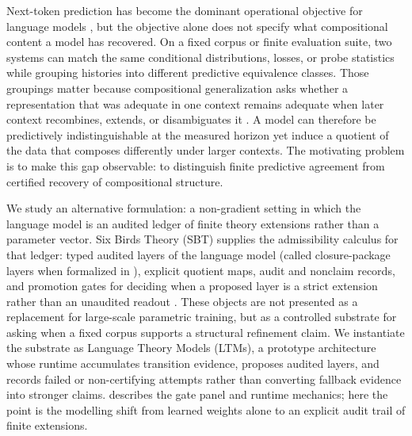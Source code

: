\documentclass{article}
\theoremstyle{definition}
\begin{document}
Next-token prediction has become the dominant operational objective for language models \cite{Vaswani2017Attention,Radford2019GPT2,Kaplan2020Scaling}, but the objective alone does not specify what compositional content a model has recovered. On a fixed corpus or finite evaluation suite, two systems can match the same conditional distributions, losses, or probe statistics while grouping histories into different predictive equivalence classes. Those groupings matter because compositional generalization asks whether a representation that was adequate in one context remains adequate when later context recombines, extends, or disambiguates it \cite{FodorPylyshyn1988Connectionism,Hupkes2020Compositionality}. A model can therefore be predictively indistinguishable at the measured horizon yet induce a quotient of the data that composes differently under larger contexts. The motivating problem is to make this gap observable: to distinguish finite predictive agreement from certified recovery of compositional structure.

We study an alternative formulation: a non-gradient setting in which the language model is an audited ledger of finite theory extensions rather than a parameter vector. Six Birds Theory (SBT) supplies the admissibility calculus for that ledger: typed audited layers of the language model (called closure-package layers when formalized in ), explicit quotient maps, audit and nonclaim records, and promotion gates for deciding when a proposed layer is a strict extension rather than an unaudited readout \cite{Tsiokos2026FoundationsIII}. These objects are not presented as a replacement for large-scale parametric training, but as a controlled substrate for asking when a fixed corpus supports a structural refinement claim. We instantiate the substrate as Language Theory Models (LTMs), a prototype architecture whose runtime accumulates transition evidence, proposes audited layers, and records failed or non-certifying attempts rather than converting fallback evidence into stronger claims.  describes the gate panel and runtime mechanics; here the point is the modelling shift from learned weights alone to an explicit audit trail of finite extensions.
\end{document}

